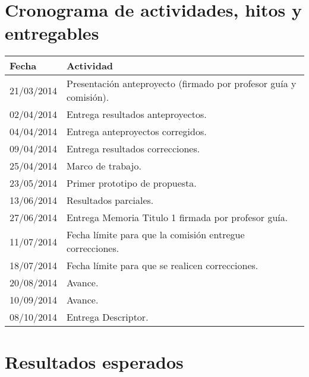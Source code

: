 \documentclass{udparticle}
\begin{document}
\section{Cronograma de actividades, hitos y entregables}
  \begin{tabular}{ll}
  \hline\noalign{\smallskip}
  Fecha & Actividad \\
  \hline\noalign{\smallskip}
  21/03/2014 & Presentación anteproyecto (firmado por profesor guía y comisión).\\

  02/04/2014 & Entrega resultados anteproyectos.\\

  04/04/2014 & Entrega anteproyectos corregidos.\\

  09/04/2014 &  Entrega resultados correcciones.\\

  25/04/2014 & Marco de trabajo.\\

  23/05/2014 & Primer prototipo de propuesta.\\

  13/06/2014 & Resultados parciales.\\

  27/06/2014 & Entrega Memoria Titulo 1 firmada por profesor guía.\\

  11/07/2014 & Fecha límite para que la comisión entregue correcciones.\\

  18/07/2014 & Fecha límite para que se realicen correcciones.\\

  20/08/2014 & Avance.\\

  10/09/2014 & Avance.\\

  08/10/2014 & Entrega Descriptor.\\


  \hline

  \end{tabular}


\section{Resultados esperados}
  
% 


\nocite{*}
\end{document}
